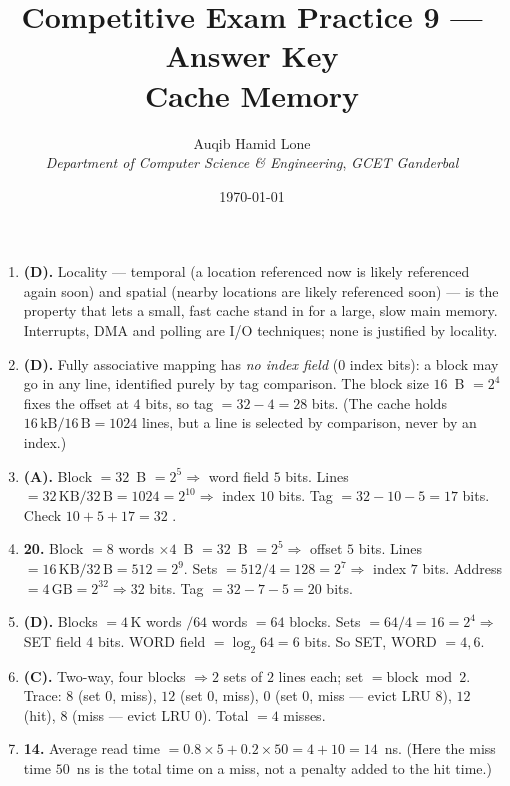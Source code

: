 \documentclass[11pt]{article}
\title{Competitive Exam Practice 9 --- Answer Key\\\large Cache Memory}
\author{Auqib Hamid Lone\\[0.3em]
  \emph{Department of Computer Science \& Engineering}, \emph{GCET Ganderbal}}
\date{\today}
\begin{document}
\maketitle

\begin{enumerate}
\item[\textbf{Q1}] \textbf{(D).} Locality — temporal (a location referenced now is likely referenced again soon) and spatial (nearby locations are likely referenced soon) — is the property that lets a small, fast cache stand in for a large, slow main memory. Interrupts, DMA and polling are I/O techniques; none is justified by locality.

\item[\textbf{Q2}] \textbf{(D).} Fully associative mapping has \emph{no index field} ($0$ index bits): a block may go in any line, identified purely by tag comparison. The block size $16$~B $= 2^4$ fixes the offset at $4$ bits, so tag $= 32 - 4 = 28$ bits. (The cache holds $16\,\mathrm{kB}/16\,\mathrm{B}=1024$ lines, but a line is selected by comparison, never by an index.)

\item[\textbf{Q3}] \textbf{(A).} Block $=32$~B $=2^5 \Rightarrow$ word field $5$ bits. Lines $=32\,\mathrm{KB}/32\,\mathrm{B}=1024=2^{10} \Rightarrow$ index $10$ bits. Tag $=32-10-5=17$ bits. Check $10+5+17=32$ \checkmark.

\item[\textbf{Q4}] \textbf{20.} Block $=8$ words $\times 4$~B $=32$~B $=2^5 \Rightarrow$ offset $5$ bits. Lines $=16\,\mathrm{KB}/32\,\mathrm{B}=512=2^9$. Sets $=512/4=128=2^7 \Rightarrow$ index $7$ bits. Address $=4\,\mathrm{GB}=2^{32} \Rightarrow 32$ bits. Tag $=32-7-5=20$ bits.

\item[\textbf{Q5}] \textbf{(D).} Blocks $=4\,\mathrm{K}$ words $/64$ words $=64$ blocks. Sets $=64/4=16=2^4 \Rightarrow$ SET field $4$ bits. WORD field $=\log_2 64=6$ bits. So SET, WORD $=4,6$.

\item[\textbf{Q6}] \textbf{(C).} Two-way, four blocks $\Rightarrow 2$ sets of $2$ lines each; set $=\mathrm{block}\bmod 2$. Trace: $8$ (set $0$, miss), $12$ (set $0$, miss), $0$ (set $0$, miss — evict LRU $8$), $12$ (hit), $8$ (miss — evict LRU $0$). Total $=4$ misses.

\item[\textbf{Q7}] \textbf{14.} Average read time $=0.8\times 5 + 0.2\times 50 = 4 + 10 = 14$~ns. (Here the miss time $50$~ns is the total time on a miss, not a penalty added to the hit time.)


\end{enumerate}
\end{document}

